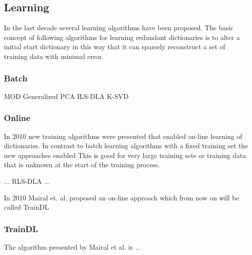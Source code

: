 \subsection{Learning}
In the last decade several learning algorithms have been proposed.
The basic concept of following algorithms for learning redundant dictionaries is to alter a initial start dictionary
in this way that it can sparsely reconstruct a set of training data with minimal error. 

\subsubsection*{Batch}
MOD \cite{Engan1999}
Generalized PCA \cite{}
ILS-DLA \cite{}
K-SVD \cite{Aharon2006}


\subsubsection*{Online}
In 2010 new training algorithms were presented that enabled on-line learning of dictionaries. 
In contrast to batch learning algorithms with a fixed training set the new approaches enabled
This is good for very large training sets or training data that is unknown at the start of the training process.

... RLS-DLA \cite{Engan2010} ...


In 2010 Mairal et. al. \cite{Mairal2010} proposed an on-line approach which from now on will be called TrainDL

\subsubsection*{TrainDL}
\label{sec:mairal}
The algorithm presented by Mairal et al. \cite{Mairal2010} is ...

